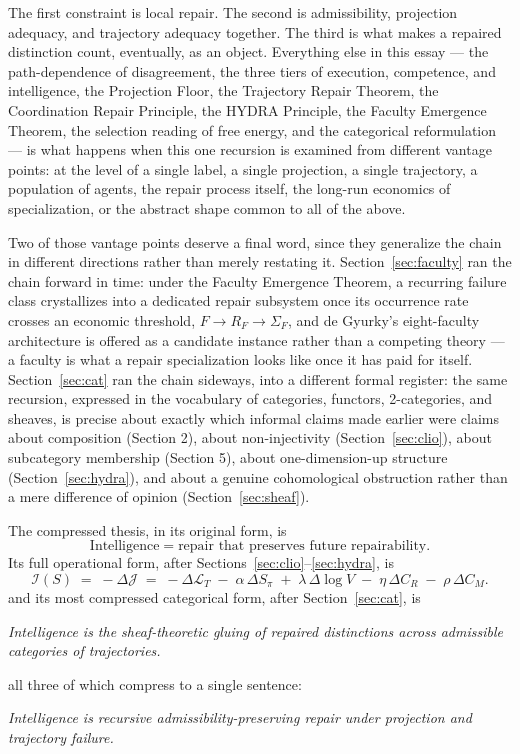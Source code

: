 \documentclass[11pt]{article}
\theoremstyle{plain}
\theoremstyle{definition}
\theoremstyle{remark}
\begin{document}
The first constraint is local repair. The second is admissibility, projection adequacy, and trajectory adequacy together. The third is what makes a repaired distinction count, eventually, as an object. Everything else in this essay --- the path-dependence of disagreement, the three tiers of execution, competence, and intelligence, the Projection Floor, the Trajectory Repair Theorem, the Coordination Repair Principle, the HYDRA Principle, the Faculty Emergence Theorem, the selection reading of free energy, and the categorical reformulation --- is what happens when this one recursion is examined from different vantage points: at the level of a single label, a single projection, a single trajectory, a population of agents, the repair process itself, the long-run economics of specialization, or the abstract shape common to all of the above.

Two of those vantage points deserve a final word, since they generalize the chain in different directions rather than merely restating it. Section~\ref{sec:faculty} ran the chain forward in time: under the Faculty Emergence Theorem, a recurring failure class crystallizes into a dedicated repair subsystem once its occurrence rate crosses an economic threshold, $F \to R_F \to \Sigma_F$, and de Gyurky's eight-faculty architecture is offered as a candidate instance rather than a competing theory --- a faculty is what a repair specialization looks like once it has paid for itself. Section~\ref{sec:cat} ran the chain sideways, into a different formal register: the same recursion, expressed in the vocabulary of categories, functors, 2-categories, and sheaves, is precise about exactly which informal claims made earlier were claims about composition (Section 2), about non-injectivity (Section~\ref{sec:clio}), about subcategory membership (Section 5), about one-dimension-up structure (Section~\ref{sec:hydra}), and about a genuine cohomological obstruction rather than a mere difference of opinion (Section~\ref{sec:sheaf}).

The compressed thesis, in its original form, is
\begin{equation}
\boxed{\;\text{Intelligence} \;=\; \text{repair that preserves future repairability.}\;}
\end{equation}
Its full operational form, after Sections~\ref{sec:clio}--\ref{sec:hydra}, is
\begin{equation}
\boxed{\;\mathcal{I}(S) \;=\; -\Delta\mathcal{J} \;=\; -\Delta\mathcal{L}_T \;-\; \alpha\,\Delta S_\pi \;+\; \lambda\,\Delta\log V \;-\; \eta\,\Delta C_R \;-\; \rho\,\Delta C_M.\;}
\end{equation}
and its most compressed categorical form, after Section~\ref{sec:cat}, is
\begin{center}
\emph{Intelligence is the sheaf-theoretic gluing of repaired distinctions across admissible categories of trajectories.}
\end{center}
all three of which compress to a single sentence:
\begin{center}
\emph{Intelligence is recursive admissibility-preserving repair under projection and trajectory failure.}
\end{center}
\end{document}
